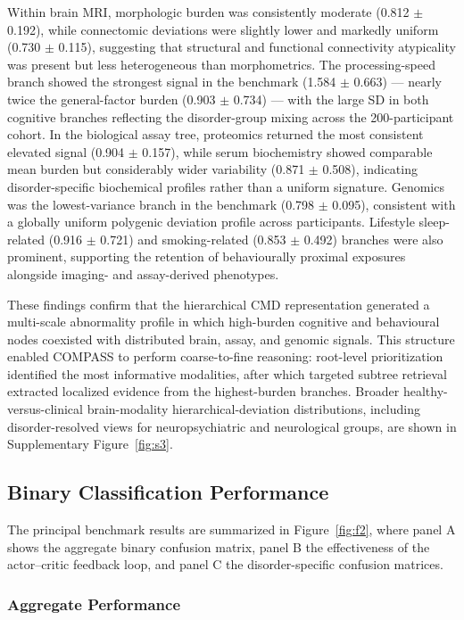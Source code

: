 \documentclass[11pt,a4paper,twoside]{article}
\begin{document}
Within brain MRI, morphologic burden was consistently moderate (0.812 $\pm$ 0.192), while connectomic deviations were slightly lower and markedly uniform (0.730 $\pm$ 0.115), suggesting that structural and functional connectivity atypicality was present but less heterogeneous than morphometrics. The processing-speed branch showed the strongest signal in the benchmark (1.584 $\pm$ 0.663) --- nearly twice the general-factor burden (0.903 $\pm$ 0.734) --- with the large SD in both cognitive branches reflecting the disorder-group mixing across the 200-participant cohort. In the biological assay tree, proteomics returned the most consistent elevated signal (0.904 $\pm$ 0.157), while serum biochemistry showed comparable mean burden but considerably wider variability (0.871 $\pm$ 0.508), indicating disorder-specific biochemical profiles rather than a uniform signature. Genomics was the lowest-variance branch in the benchmark (0.798 $\pm$ 0.095), consistent with a globally uniform polygenic deviation profile across participants. Lifestyle sleep-related (0.916 $\pm$ 0.721) and smoking-related (0.853 $\pm$ 0.492) branches were also prominent, supporting the retention of behaviourally proximal exposures alongside imaging- and assay-derived phenotypes.

These findings confirm that the hierarchical CMD representation generated a multi-scale abnormality profile in which high-burden cognitive and behavioural nodes coexisted with distributed brain, assay, and genomic signals. This structure enabled COMPASS to perform coarse-to-fine reasoning: root-level prioritization identified the most informative modalities, after which targeted subtree retrieval extracted localized evidence from the highest-burden branches. Broader healthy-versus-clinical brain-modality hierarchical-deviation distributions, including disorder-resolved views for neuropsychiatric and neurological groups, are shown in Supplementary Figure~\ref{fig:s3}.

\subsection{Binary Classification Performance}

The principal benchmark results are summarized in Figure~\ref{fig:f2}, where panel A shows the aggregate binary confusion matrix, panel B the effectiveness of the actor--critic feedback loop, and panel C the disorder-specific confusion matrices.

\subsubsection{Aggregate Performance}
\end{document}

